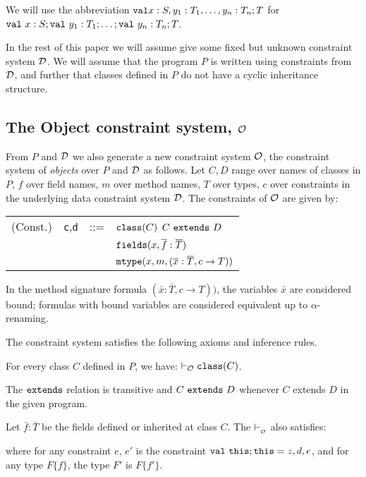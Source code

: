 \documentclass[preprint,nocopyrightspace,9pt]{sigplanconf}
\def\val{\mbox{\tt val}}
\def\klass{\mbox{\tt class}}
\def\this{\mbox{\tt this}}
\def\extends{\mbox{\tt extends}}
\def\fields{\mbox{\tt fields}}
\def\mtype{\mbox{\tt mtype}}
\newcommand\alt{\bnf}
\begin{document}
We will use the abbreviation  $\val x:S,y_1:T_1,\ldots,y_n:T_n;T$
for $\val\ x:S; \val\ y_1:T_1;\ldots;\val\ y_n:T_n;T$.

In the rest of this paper we will assume give some fixed but unknown
constraint system $\cal D$. We will assume that the program $P$ is
written using constraints from $\cal D$, and further that classes
defined in $P$ do not have a cyclic inheritance structure. 

\subsection{The Object constraint system, $\cal O$}\label{sec:O}

From $P$ and $\cal D$ we also generate a new constraint system $\cal
O$, the constraint system of {\em objects} over $P$ and $\cal D$ as
follows. Let $C,D$ range over names of classes in $P$, $f$ over
field names, $m$ over method names, $T$ over types, $c$ over
constraints in the underlying data constraint system $\cal D$.
The constraints of $\cal O$ are given by:

\begin{tabular}{r@{\quad}rcl}
(Const.) & {\tt c},{\tt d} &{::=}& $\klass(C)$ \alt $C\ \extends\ D$ \\
&&& \alt $\fields(x, \bar{f}:\bar{T})$ \\
&&& \alt $\mtype(x,m, (\bar{x}:\bar{T},c \rightarrow T))$\\
\end{tabular}

In the method signature formula $(\bar{x}:\bar{T},c \rightarrow T))$,
the variables $\bar{x}$ are considered bound; formulas with bound variables are considered
equivalent up to $\alpha$-renaming.

The constraint system satisfies the following axioms and inference
rules. 

For every class $C$ defined in $P$, we have: $\vdash_{\cal O} \klass(C)$.

The $\extends$ relation is transitive and $C\ \extends\ D$ whenever
$C$ extends $D$ in the given program.

Let $\bar{f}:\bar{T}$ be the fields defined or inherited at class $C$.
The $\vdash_{\cal_O}$ also satisfies:

\infax[fields]{\Gamma, z:D\{d\} \vdash_{\cal O} \fields(z, \bar{f}:\bar{T'})}

\noindent where for any constraint $e$, $e'$ is the constraint $\val\ \this;\this=z,d,e$,
and for any type $F\{f\}$, the type $F'$ is $F\{f'\}$.
\end{document}
